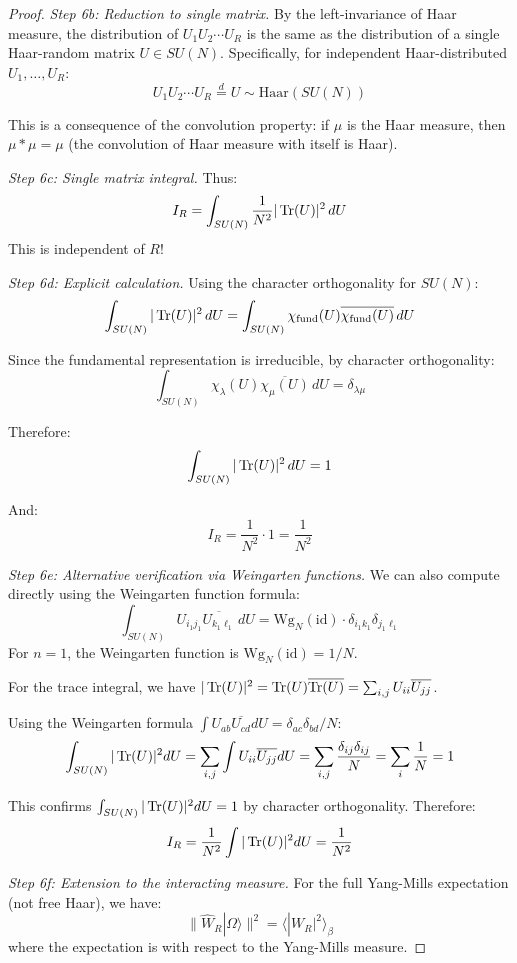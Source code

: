 \begin{proof}
\textit{Step 6b: Reduction to single matrix.}
By the left-invariance of Haar measure, the distribution of $U_1 U_2 \cdots U_R$ 
is the same as the distribution of a single Haar-random matrix $U \in SU(N)$. 
Specifically, for independent Haar-distributed $U_1, \ldots, U_R$:
\[
U_1 U_2 \cdots U_R \stackrel{d}{=} U \sim \text{Haar}(SU(N))
\]

This is a consequence of the convolution property: if $\mu$ is the Haar measure, 
then $\mu * \mu = \mu$ (the convolution of Haar measure with itself is Haar).

\textit{Step 6c: Single matrix integral.}
Thus:
\[
I_R = \int_{SU(N)} \frac{1}{N^2}|\operatorname{Tr}(U)|^2 \, dU
\]
This is independent of $R$!

\textit{Step 6d: Explicit calculation.}
Using the character orthogonality for $SU(N)$:
\[
\int_{SU(N)} |\operatorname{Tr}(U)|^2 \, dU = \int_{SU(N)} \chi_{\text{fund}}(U) \overline{\chi_{\text{fund}}(U)} \, dU
\]

Since the fundamental representation is irreducible, by character orthogonality:
\[
\int_{SU(N)} \chi_\lambda(U) \overline{\chi_\mu(U)} \, dU = \delta_{\lambda\mu}
\]

Therefore:
\[
\int_{SU(N)} |\operatorname{Tr}(U)|^2 \, dU = 1
\]

And:
\[
I_R = \frac{1}{N^2} \cdot 1 = \frac{1}{N^2}
\]

\textit{Step 6e: Alternative verification via Weingarten functions.}
We can also compute directly using the Weingarten function formula:
\[
\int_{SU(N)} U_{i_1 j_1} \overline{U_{k_1 \ell_1}} \, dU = \text{Wg}_N(\text{id}) \cdot \delta_{i_1 k_1} \delta_{j_1 \ell_1}
\]
For $n = 1$, the Weingarten function is $\text{Wg}_N(\text{id}) = 1/N$.

For the trace integral, we have $|\operatorname{Tr}(U)|^2 = \operatorname{Tr}(U)\overline{\operatorname{Tr}(U)} = \sum_{i,j} U_{ii} \overline{U_{jj}}$.

Using the Weingarten formula $\int U_{ab}\overline{U_{cd}} dU = \delta_{ac}\delta_{bd}/N$:
\[
\int_{SU(N)} |\operatorname{Tr}(U)|^2 dU = \sum_{i,j} \int U_{ii} \overline{U_{jj}} dU 
= \sum_{i,j} \frac{\delta_{ij}\delta_{ij}}{N} = \sum_i \frac{1}{N} = 1
\]

This confirms $\int_{SU(N)} |\operatorname{Tr}(U)|^2 dU = 1$ by character orthogonality. Therefore:
\[
I_R = \frac{1}{N^2} \int |\operatorname{Tr}(U)|^2 dU = \frac{1}{N^2}
\]

\textit{Step 6f: Extension to the interacting measure.}
For the full Yang-Mills expectation (not free Haar), we have:
\[
\|\hat{W}_R |\Omega\rangle\|^2 = \langle |W_R|^2 \rangle_\beta
\]
where the expectation is with respect to the Yang-Mills measure.


\end{proof}
